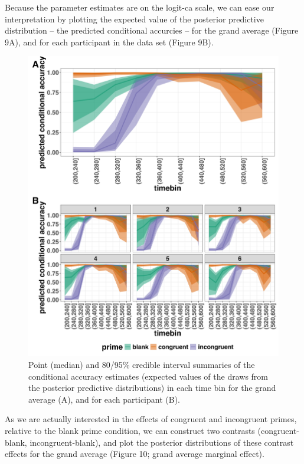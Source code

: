 \documentclass[
  man, donotrepeattitle,floatsintext]{apa6}
\begin{document}
Because the parameter estimates are on the logit-ca scale, we can ease our interpretation by plotting the expected value of the posterior predictive distribution -- the predicted conditional accurcies -- for the grand average (Figure 9A), and for each participant in the data set (Figure 9B).



\begin{figure}[H]

{\centering \includegraphics[width=0.8\linewidth,height=0.67\textheight,]{../Tutorial_2_Bayesian/figures/M1i_ca_pred_combined} 

}

\caption{Point (median) and 80/95\% credible interval summaries of the conditional accuracy estimates (expected values of the draws from the posterior predictive distributions) in each time bin for the grand average (A), and for each participant (B).}\label{fig:plot-pred-grand-effects-ca}
\end{figure}

As we are actually interested in the effects of congruent and incongruent primes, relative to the blank prime condition, we can construct two contrasts (congruent-blank, incongruent-blank), and plot the posterior distributions of these contrast effects for the grand average (Figure 10; grand average marginal effect).
\end{document}
